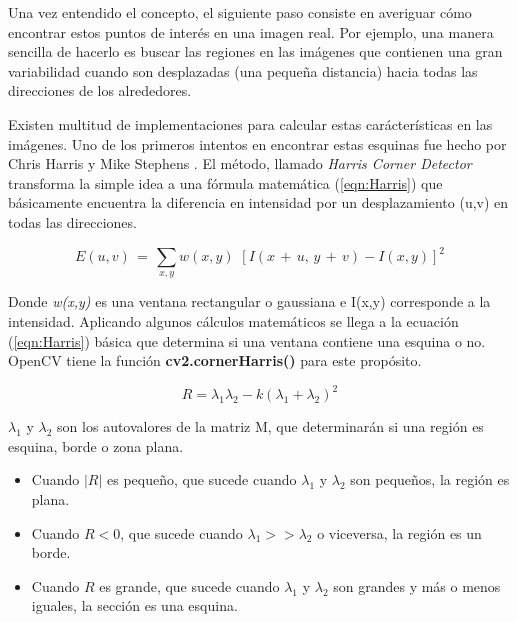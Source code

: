 Una vez entendido el concepto, el siguiente paso consiste en averiguar cómo encontrar estos puntos de interés en una imagen real. Por ejemplo, una manera sencilla de hacerlo es buscar las regiones en las imágenes que contienen una gran variabilidad cuando son desplazadas (una pequeña distancia) hacia todas las direcciones de los alrededores.

Existen multitud de implementaciones para calcular estas carácterísticas en las imágenes. Uno de los primeros intentos en encontrar estas esquinas fue hecho por Chris Harris y Mike Stephens \parencite{Reference8}. El método, llamado \textit{Harris Corner Detector} transforma la simple idea a una fórmula matemática (\ref{eqn:Harris}) que básicamente encuentra la diferencia en intensidad por un desplazamiento (u,v) en todas las direcciones.

\begin{equation}
E(u,v)\,=\,\sum_{x,y}w(x,y)\,\,[I(x\,+\, u,\, y\,+\, v)-I(x,y)]^{2}
\label{eqn:Harris}
\end{equation}

Donde \textit{w(x,y)} es una ventana rectangular o gaussiana e I(x,y) corresponde a la intensidad. Aplicando algunos cálculos matemáticos se llega a la ecuación (\ref{eqn:Harris}) básica que determina si una ventana contiene una esquina o no. OpenCV tiene la función \textbf{cv2.cornerHarris()} para este propósito.

\begin{equation}
R=\lambda_{1}\lambda_{2}-k(\lambda_{1}+\lambda_{2})^{2}
\label{eqn:Harris2}
\end{equation}

$\lambda_{1}$ y $\lambda_{2}$ son los autovalores de la matriz M, que determinarán si una región es esquina, borde o zona plana.

\begin{itemize}
\item Cuando $|R|$ es pequeño, que sucede cuando $\lambda_{1}$ y $\lambda_{2}$ son pequeños, la región es plana.

\item Cuando $R < 0$, que sucede cuando $\lambda_{1} >> \lambda_{2}$ o viceversa, la región es un borde.

\item Cuando $R$ es grande, que sucede cuando $\lambda_{1}$ y $\lambda_{2}$ son grandes y más o menos iguales, la sección es una esquina.

\end{itemize}

